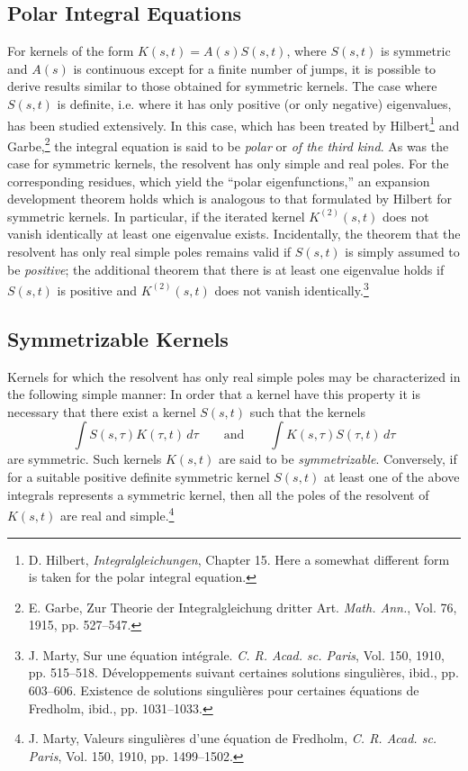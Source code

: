 \subsection{Polar Integral Equations}
For kernels of the form $K(s,t)=A(s)S(s,t)$, where $S(s,t)$ is symmetric and $A(s)$ is continuous except for a finite number of jumps, it is possible to derive results similar to those obtained for symmetric kernels. The case where $S(s,t)$ is definite, i.e. where it has only positive (or only negative) eigenvalues, has been studied extensively. In this case, which has been treated by Hilbert\footnote{D. Hilbert, \emph{Integralgleichungen}, Chapter 15. Here a somewhat different form is taken for the polar integral equation.} and Garbe,\footnote{E. Garbe, Zur Theorie der Integralgleichung dritter Art. \emph{Math. Ann.}, Vol. 76, 1915, pp. 527--547.} the integral equation is said to be \emph{polar} or \emph{of the third kind}. As was the case for symmetric kernels, the resolvent has only simple and real poles. For the corresponding residues, which yield the ``polar eigenfunctions,'' an expansion development theorem holds which is analogous to that formulated by Hilbert for symmetric kernels. In particular, if the iterated kernel $K^{(2)}(s,t)$ does not vanish identically at least one eigenvalue exists. Incidentally, the theorem that the resolvent has only real simple poles remains valid if $S(s,t)$ is simply assumed to be \emph{positive}; the additional theorem that there is at least one eigenvalue holds if $S(s,t)$ is positive and $K^{(2)}(s,t)$ does not vanish identically.\footnote{J. Marty, Sur une \'equation int\'egrale. \emph{C. R. Acad. sc. Paris}, Vol. 150, 1910, pp. 515--518. D\'eveloppements suivant certaines solutions singuli\`eres, ibid., pp. 603--606. Existence de solutions singuli\`eres pour certaines \'equations de Fredholm, ibid., pp. 1031--1033.}

\subsection{Symmetrizable Kernels}
Kernels for which the resolvent has only real simple poles may be characterized in the following simple manner: In order that a kernel have this property it is necessary that there exist a kernel $S(s,t)$ such that the kernels
\[
\int S(s,\tau)K(\tau,t)\,d\tau
\qquad\text{and}\qquad
\int K(s,\tau)S(\tau,t)\,d\tau
\]
are symmetric. Such kernels $K(s,t)$ are said to be \emph{symmetrizable}. Conversely, if for a suitable positive definite symmetric kernel $S(s,t)$ at least one of the above integrals represents a symmetric kernel, then all the poles of the resolvent of $K(s,t)$ are real and simple.\footnote{J. Marty, Valeurs singuli\`eres d'une \'equation de Fredholm, \emph{C. R. Acad. sc. Paris}, Vol. 150, 1910, pp. 1499--1502.}

